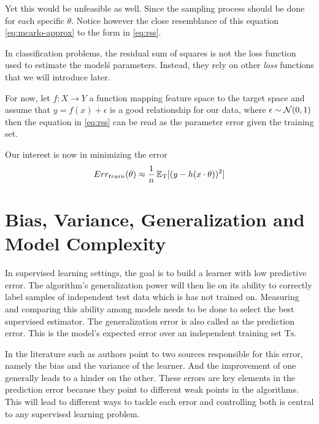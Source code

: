 Yet this would be unfeasible as well. Since the sampling process should be done for each specific $\theta$. Notice however the close resemblance of this equation \cref{eq:mcarlo-approx} to the form in \cref{eq:rss}.

In classification problems, the residual sum of squares is not the loss function used to estimate the model\'s parameters. Instead, they rely on other \textit{loss} functions that we will introduce later.

For now, let $f: X \rightarrow Y$ a function mapping feature space to the target space and assume that $y = f(x) + \epsilon $ is a good relationship for our data, where $\epsilon \sim \operatorname{\mathcal{N}}(0,1) $ then the equation in \cref{eq:rss} can be read as the parameter error given the training set.

Our interest is now in minimizing the error
\begin{equation}
Err_{train}(\theta) \approx \frac{1}{n} \operatorname{\mathbb{E}}_{ \mathrm{T}}[(y - h(x \cdot \theta) )^2]
\end{equation}


\section{Bias, Variance, Generalization and Model Complexity}\label{section-biasVariance}

In supervised learning settings, the goal is to build a learner with low predictive error. The algorithm's generalization power will then lie on its ability to correctly label samples of independent test data which is has not trained on. Measuring and comparing this ability among models needs to be done to select the best supervised estimator. The generalization error is also called as the prediction error. This is the model's expected error over an independent training set $\mathrm{Ts}$.

In the literature such as \textcite{james-biasVarianceGeneral} authors point to two sources responsible for this error, namely the bias and the variance of the learner. And the improvement of one generally leads to a hinder on the other. These errors are key elements in the prediction error because they point to different weak points in the algorithms. This will lead to different ways to tackle each error and controlling both is central to any supervised learning problem.

